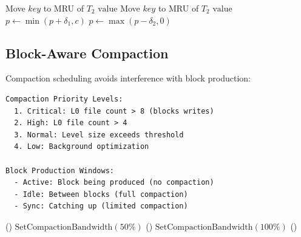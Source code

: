 \documentclass[11pt,a4paper]{article}
\begin{document}
\begin{algorithm}
\caption{ARC Cache Access}
\begin{algorithmic}[1]
     
        \State Move $key$ to MRU of $T_2$
        \Return $\text{value}$
     
        \State Move $key$ to MRU of $T_2$
        \Return $\text{value}$
     
        \State $p \gets \min(p + \delta_1, c)$ 
        \State {}
        \Return {}
     
        \State $p \gets \max(p - \delta_2, 0)$ 
        \State {}
        \Return {}
    \Else
        \Return {} 
    \EndIf
\EndProcedure
\end{algorithmic}
\end{algorithm}

\subsection{Block-Aware Compaction}

Compaction scheduling avoids interference with block production:

\begin{lstlisting}
Compaction Priority Levels:
  1. Critical: L0 file count > 8 (blocks writes)
  2. High: L0 file count > 4
  3. Normal: Level size exceeds threshold
  4. Low: Background optimization

Block Production Windows:
  - Active: Block being produced (no compaction)
  - Idle: Between blocks (full compaction)
  - Sync: Catching up (limited compaction)
\end{lstlisting}

\begin{algorithm}
\caption{Block-Aware Compaction Scheduler}
\begin{algorithmic}[1]
            \State {}() 
        \Else
            \Return {}
        \EndIf
        \State $\text{SetCompactionBandwidth}(50\%)$
        \State {}()
    \Else
        \State $\text{SetCompactionBandwidth}(100\%)$
        \State {}()
    \EndIf
\EndProcedure
\end{algorithmic}
\end{algorithm}
\end{document}
